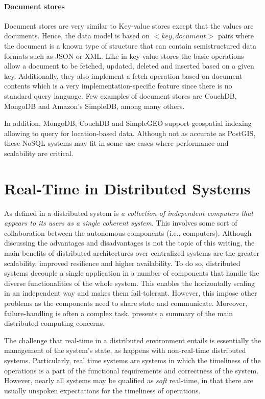 \paragraph{Document stores}

Document stores are very similar to Key-value stores except that the values are documents. Hence, the data model is based on ${<key, document>}$ pairs where the document is a known type of structure that can contain semistructured data formats such as JSON or XML. Like in key-value stores the basic operations allow a document to be fetched, updated, deleted and inserted based on a given key. Additionally, they also implement a fetch operation based on document contents which is a very implementation-specific feature since there is no standard query language. Few examples of document stores are CouchDB, MongoDB and Amazon's SimpleDB, among many others.  

In addition, MongoDB, CouchDB and SimpleGEO support geospatial indexing allowing to query for location-based data. Although not as accurate as PostGIS, these NoSQL systems may fit in some use cases where performance and scalability are critical.

\section{Real-Time in Distributed Systems}

As defined in \cite{distributed-systems-book} a distributed system is \textit{a collection of independent computers that appears to its users as a single coherent system}. This involves some sort of collaboration between the autonomous components (i.e., computers). Although discussing the advantages and disadvantages is not the topic of this writing, the main benefits of distributed architectures over centralized systems are the greater scalability, improved resilience and higher availability. To do so, distributed systems decouple a single application in a number of components that handle the diverse functionalities of the whole system. This enables the horizontally scaling in an independent way and makes them fail-tolerant. However, this impose other problems as the components need to share state and communicate. Moreover, failure-handling is often a complex task. \cite{DT-fallacies} presents a summary of the main distributed computing concerns.

The challenge that real-time in a distributed environment entails is essentially the management of the system's state, as happens with non-real-time distributed systems. Particularly, real time systems are systems in which the timeliness of the operations is a part of the functional requirements and correctness of the system. However, nearly all systems may be qualified as \textit{soft} real-time, in that there are usually unspoken expectations for the timeliness of operations.

